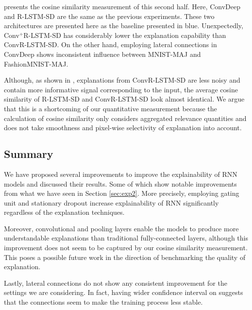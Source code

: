 \addfigure{\ref{fig:rel_dist_convdeep_trans_exp}} presents the cosine similarity measurement of this second half. Here, ConvDeep and R-LSTM-SD are the same as the previous experiments. These two architectures are presented here as the baseline presented in blue. Unexpectedly, Conv$^+$R-LSTM-SD has considerably lower the explanation capability than ConvR-LSTM-SD. On the other hand,  employing lateral connections in ConvDeep shows inconsistent influence between MNIST-MAJ and FashionMNIST-MAJ. 

 Although,  as shown in \addfigure{\ref{fig:heatmap_msc_convrlstm_pos_rel}}, explanations from ConvR-LSTM-SD are less noisy and contain more informative signal corresponding to the input, the average cosine similarity of R-LSTM-SD and ConvR-LSTM-SD look almost identical. We argue that this is a shortcoming of our quantitative measurement because the calculation of cosine similarity only considers aggregated relevance quantities and does not take smoothness and pixel-wise selectivity of explanation into account.
 


\subsection{Summary}
We have proposed several improvements to improve the explainability of RNN models and discussed their results.  Some of which show notable improvements from what we have seen in Section \ref{sec:exp2}. More precisely, employing gating unit and stationary dropout increase explainability of RNN significantly regardless of the explanation techniques.

Moreover, convolutional and pooling layers enable the models to produce more understandable explanations than traditional fully-connected layers, although this improvement does not seem to be  captured by our cosine similarity measurement. This poses a possible future work in the direction of benchmarking the quality of explanation.

Lastly, lateral connections do not show any consistent improvement for the settings we are considering. In fact, having wider confidence interval on \addfigure{\ref{fig:rel_dist_convdeep_trans_exp}} suggests that the connections seem to make the training process less stable.

